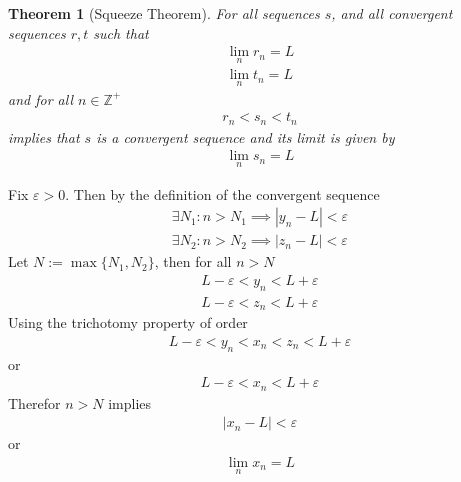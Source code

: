 \documentclass{amsart}
\numberwithin{equation}{section}
\let\oldendproof\endproof
\renewenvironment{proof}[1][\proofname]{%
  \setcounter{case}{0}
  \setcounter{step}{0}
  \oldproof[#1]%
}{\oldendproof}
\theoremstyle{plain}
\newtheorem{theorem}{Theorem}[section]
\theoremstyle{definition}
\theoremstyle{remark}
\begin{document}
\begin{theorem}[Squeeze Theorem]
  For all sequences $s$, and all convergent sequences $r, t$ such that
  \begin{align}
    \lim_n r_n = L\nonumber\\
    \lim_n t_n = L
  \end{align}
  and for all $n\in\mathbb{Z}^+$
  \begin{align}
    r_n < s_n < t_n
  \end{align}
  implies that $s$ is a convergent sequence and its limit is given by
  \begin{align}
    \lim_n s_n = L
  \end{align}
\end{theorem}
\begin{proof}
  Fix $\varepsilon> 0 $.
  Then by the definition of the convergent sequence
  \begin{align}
    \exists N_1: n > N_1 \implies |y_n - L | < \varepsilon\nonumber\\
    \exists N_2: n > N_2 \implies |z_n - L| < \varepsilon
  \end{align}
  Let $N:= \max \{ N_1, N_2 \}$, then for all $n> N$
  \begin{align}
    L- \varepsilon < y_n < L + \varepsilon\nonumber\\
    L - \varepsilon < z_n < L + \varepsilon
  \end{align}
  Using the trichotomy property of order
  \begin{align}
    L - \varepsilon < y_n < x_n < z_n < L+\varepsilon
  \end{align}
  or
  \begin{align}
    L - \varepsilon < x_n < L+ \varepsilon
  \end{align}
  Therefor $n>N$ implies
  \begin{align}
    |x_n - L | < \varepsilon
  \end{align}
  or
  \begin{align}
    \lim_n x_n = L
  \end{align}
\end{proof}
\end{document}
